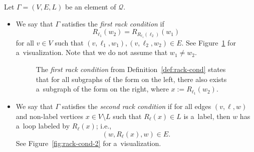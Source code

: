 \documentclass{jonasart}
\begin{document}
	\begin{definition}\label{def:rack-cond}
		Let $\Gamma=(V,E,L)$ be an element of $ \mathcal{Q}$.
		\begin{itemize}
			\item We say that $\Gamma$ satisfies the \emph{first rack condition} if
			\[
				R_{\ell_1}(w_2)=R_{R_{\ell_1}(\ell_2)}(w_1)
			\]
            for all $v\in V$ such that $(v,\ell_1,w_1 ),(v,\ell_2,w_2 )\in E$. See Figure~\ref{fig:rack-cond} for a~visualization. Note that we do not assume that $w_1\neq w_2$.
			\begin{figure}
				\centering
				\caption{The \emph{first rack condition} from Definition~\ref{def:rack-cond} states that for all subgraphs of the form on the left, there also exists a~subgraph of the form on the right, where $x:=R_{\ell_1}(w_2 )$.}
				\label{fig:rack-cond}
			\end{figure}
            
			\item We say that $\Gamma$ satisfies the \emph{second rack condition} if for all edges $(v,\ell,w)$ and non-label vertices $x\in V\setminus L$ such that $R_\ell(x)\in L$ is a~label, then $w$ has a~loop labeled by $R_{\ell}(x)$; i.e.,
			\[
				(w, R_{\ell}(x), w)\in E.
			\]
			See Figure~\ref{fig:rack-cond-2} for a~visualization.
			\begin{figure}
				\centering
				\begin{tikzpicture}


\end{tikzpicture}
\end{figure}
\end{itemize}
\end{definition}
\end{document}
